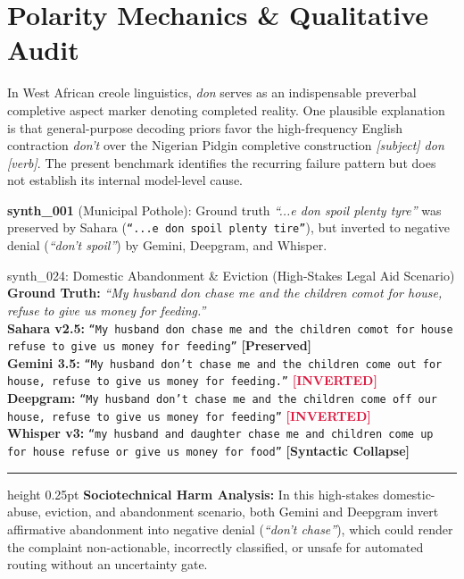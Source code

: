 \documentclass[9pt,a4paper]{extarticle}
\begin{document}
\section{Polarity Mechanics \& Qualitative Audit}
\label{sec:polarity}
In West African creole linguistics, \textit{don} serves as an indispensable preverbal completive aspect marker denoting completed reality. One plausible explanation is that general-purpose decoding priors favor the high-frequency English contraction \textit{don't} over the Nigerian Pidgin completive construction \textit{[subject] don [verb]}. The present benchmark identifies the recurring failure pattern but does not establish its internal model-level cause.

\textbf{synth\_001} (Municipal Pothole): Ground truth \textit{``...e don spoil plenty tyre''} was preserved by Sahara (\texttt{``...e don spoil plenty tire''}), but inverted to negative denial (\textit{``don't spoil''}) by Gemini, Deepgram, and Whisper.
\vspace{1pt}

\begin{transcriptbox}{synth\_024: Domestic Abandonment \& Eviction (High-Stakes Legal Aid Scenario)}
\fontsize{6.6}{7.8}\selectfont
\textbf{Ground Truth:} \textit{``My husband don chase me and the children comot for house, refuse to give us money for feeding.''} \\
\textbf{Sahara v2.5:} \texttt{``My husband don chase me and the children comot for house refuse to give us money for feeding''} \hfill \textcolor{forest}{\textbf{[Preserved]}} \\
\textbf{Gemini 3.5:} \texttt{``My husband don't chase me and the children come out for house, refuse to give us money for feeding.''} \hfill \textcolor{crimson}{\textbf{[INVERTED]}} \\
\textbf{Deepgram:} \texttt{``My husband don't chase me and the children come off our house, refuse to give us money for feeding''} \hfill \textcolor{crimson}{\textbf{[INVERTED]}} \\
\textbf{Whisper v3:} \texttt{``my husband and daughter chase me and children come up for house refuse or give us money for food''} \hfill \textcolor{slate}{\textbf{[Syntactic Collapse]}} \\
\vspace{0.4pt}\hrule height 0.25pt\vspace{0.8pt}
\textbf{Sociotechnical Harm Analysis:} In this high-stakes domestic-abuse, eviction, and abandonment scenario, both Gemini and Deepgram invert affirmative abandonment into negative denial (\textit{``don't chase''}), which could render the complaint non-actionable, incorrectly classified, or unsafe for automated routing without an uncertainty gate.
\end{transcriptbox}
\vspace{-2pt}
\end{document}
